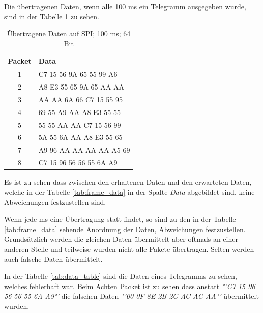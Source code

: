 Die übertragenen Daten, wenn alle 100 ms ein Telegramm ausgegeben wurde, sind in der Tabelle \ref{tab:packet_data_2cols} zu sehen. 

\begin{table}[h!]
    \centering
    \begin{tabular}{c||l}
        \toprule
        \textbf{Packet} & \textbf{Data} \\ 
        \midrule
        1 & C7 15 56 9A 65 55 99 A6 \\
        2 & A8 E3 55 65 9A 65 AA AA \\
        3 & AA AA 6A 66 C7 15 55 95 \\
        4 & 69 55 A9 AA A8 E3 55 55 \\
        5 & 55 55 AA AA C7 15 56 99 \\
        6 & 5A 55 6A AA A8 E3 55 65 \\
        7 & A9 96 AA AA AA AA A5 69 \\
        8 & C7 15 96 56 56 55 6A A9 \\
        \bottomrule
    \end{tabular}
    \caption{Übertragene Daten auf SPI; 100 ms; 64 Bit}
    \label{tab:packet_data_2cols}
\end{table}

Es ist zu sehen dass zwischen den erhaltenen Daten und den erwarteten Daten, welche in der Tabelle \ref{tab:frame_data} in der Spalte \textit{Data} abgebildet sind, keine Abweichungen festzustellen sind.

Wenn jede ms eine Übertragung statt findet, so sind zu den in der Tabelle \ref{tab:frame_data} sehende Anordnung der Daten, Abweichungen festzustellen. Grundsätzlich werden die gleichen Daten übermittelt aber oftmals an einer anderen Stelle und teilweise wurden nicht alle Pakete übertragen. Selten werden auch falsche Daten übermittelt.

In der Tabelle \ref{tab:data_table} sind die Daten eines Telegramms zu sehen, welches fehlerhaft war. Beim Achten Packet ist zu sehen dass anstatt \textit{"'C7 15 96 56 56 55 6A A9"'} die falschen Daten \textit{"'00 0F 8E 2B 2C AC AC AA"'} übermittelt wurden.

